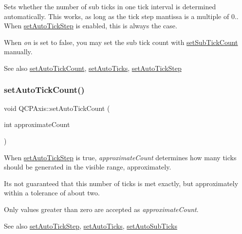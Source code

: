 Sets whether the number of sub ticks in one tick interval is determined automatically. This works, as long as the tick step mantissa is a multiple of 0.. When \mbox{\hyperlink{class_q_c_p_axis_a99fe77b034e06f5b723995beab96e741}{set\+Auto\+Tick\+Step}} is enabled, this is always the case.

When {\itshape on} is set to false, you may set the sub tick count with \mbox{\hyperlink{class_q_c_p_axis_a4b1554ead9d7f9799650d51383e326dd}{set\+Sub\+Tick\+Count}} manually.

\begin{DoxySeeAlso}{See also}
\mbox{\hyperlink{class_q_c_p_axis_a7c7111cbeac9ec5fcb40f93a1ef51a0b}{set\+Auto\+Tick\+Count}}, \mbox{\hyperlink{class_q_c_p_axis_ae867c23d3a6a7bd4d09cc66c5d018f63}{set\+Auto\+Ticks}}, \mbox{\hyperlink{class_q_c_p_axis_a99fe77b034e06f5b723995beab96e741}{set\+Auto\+Tick\+Step}} 
\end{DoxySeeAlso}
\mbox{\label{class_q_c_p_axis_a7c7111cbeac9ec5fcb40f93a1ef51a0b}} 
\subsubsection{\texorpdfstring{set\+Auto\+Tick\+Count()}{setAutoTickCount()}}
{\footnotesize\ttfamily void Q\+C\+P\+Axis\+::set\+Auto\+Tick\+Count (\begin{DoxyParamCaption}\item[{int}]{approximate\+Count }\end{DoxyParamCaption})}

When \mbox{\hyperlink{class_q_c_p_axis_a99fe77b034e06f5b723995beab96e741}{set\+Auto\+Tick\+Step}} is true, {\itshape approximate\+Count} determines how many ticks should be generated in the visible range, approximately.

It\textquotesingle{}s not guaranteed that this number of ticks is met exactly, but approximately within a tolerance of about two.

Only values greater than zero are accepted as {\itshape approximate\+Count}.

\begin{DoxySeeAlso}{See also}
\mbox{\hyperlink{class_q_c_p_axis_a99fe77b034e06f5b723995beab96e741}{set\+Auto\+Tick\+Step}}, \mbox{\hyperlink{class_q_c_p_axis_ae867c23d3a6a7bd4d09cc66c5d018f63}{set\+Auto\+Ticks}}, \mbox{\hyperlink{class_q_c_p_axis_adcbdec7a60054b88571e89599f4a45bf}{set\+Auto\+Sub\+Ticks}} 
\end{DoxySeeAlso}
\mbox{\label{class_q_c_p_axis_aaa47e3a6bac0c20d4beb9028f01bc1a1}} 
